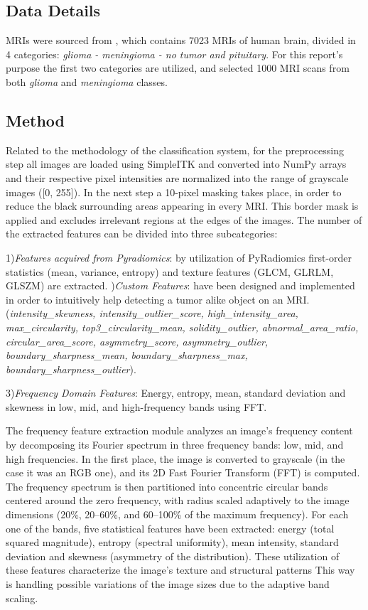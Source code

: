 \documentclass[11pt,a4paper]{article}
\begin{document}
    \subsection{Data Details}
	MRIs were sourced from \cite{data}, which contains 7023 MRIs of human brain, divided 
	in 4 categories: \textit{glioma - meningioma - no tumor and pituitary}.
	For this report's purpose the first two categories are utilized, and selected 1000 MRI scans from both \textit{glioma} and
	\textit{meningioma} classes.

    \subsection{Method}
	
	\par Related to the methodology of the classification system, for the preprocessing step
	all images are loaded using SimpleITK
	and converted into NumPy arrays and their respective pixel intensities are 
	normalized into the range of grayscale images ([0, 255]).
	In the next step a 10-pixel masking takes place, in order to reduce the black surrounding areas
	appearing in every MRI. This border mask is applied and excludes irrelevant regions at the 
	edges of the images. The number of the extracted features can be divided into three subcategories:

	1)\textit{Features acquired from Pyradiomics}: by utilization of PyRadiomics first-order statistics (mean, variance, entropy) and
	texture features (GLCM, GLRLM, GLSZM) are extracted.
	)\textit{Custom Features}: have been designed and implemented in order to intuitively help detecting a tumor alike
	object on an MRI. (\textit{intensity\_skewness, intensity\_outlier\_score, high\_intensity\_area, max\_circularity,
	top3\_circularity\_mean, solidity\_outlier, abnormal\_area\_ratio, circular\_area\_score, asymmetry\_score, asymmetry\_outlier,
	boundary\_sharpness\_mean, boundary\_sharpness\_max, boundary\_sharpness\_outlier}).

	3)\textit{Frequency Domain Features}: Energy, entropy, mean, standard deviation and skewness in low, mid, and high-frequency 
	bands using FFT.
	
	The frequency feature extraction module analyzes an image's frequency content 
	by decomposing its Fourier spectrum in three frequency bands: low, mid, and high frequencies. 
	In the first place, the image is converted to grayscale (in the case it was an RGB one), 
	and its 2D Fast Fourier Transform (FFT) is computed. 
	The frequency spectrum is then partitioned into concentric circular bands 
	centered around the zero frequency, with radius scaled adaptively to the image 
	dimensions (20\%, 20–60\%, and 60–100\% of the maximum frequency). 
	For each one of the bands, five statistical features have been extracted:
	energy (total squared magnitude), entropy (spectral uniformity), mean intensity, standard deviation
	and skewness (asymmetry of the distribution). 
	These utilization of these features characterize the image's texture and structural patterns 
	This way is handling possible variations of the image sizes due to the adaptive band scaling.
	
\end{document}
